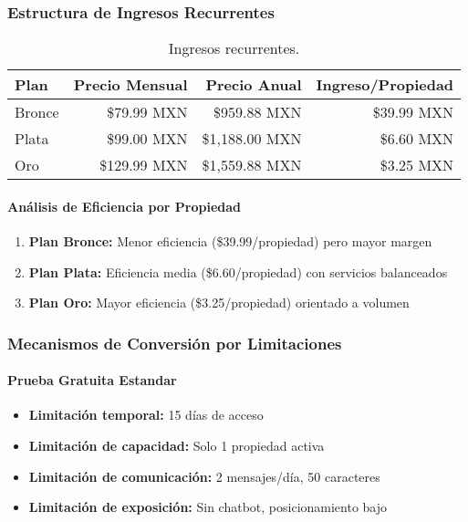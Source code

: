 			\subsubsection{Estructura de Ingresos Recurrentes}
				\begin{table}[h]
					\centering
					\begin{tabular}{|l|r|r|r|}
						\hline
						\textbf{Plan} & \textbf{Precio Mensual} & \textbf{Precio Anual} & \textbf{Ingreso/Propiedad} \\
						\hline
						Bronce & \$79.99 MXN & \$959.88 MXN & \$39.99 MXN \\
						Plata & \$99.00 MXN & \$1,188.00 MXN & \$6.60 MXN \\
						Oro & \$129.99 MXN & \$1,559.88 MXN & \$3.25 MXN \\
						\hline
					\end{tabular}
					\caption{Ingresos recurrentes.}
					\label{tab:ingresos}
				\end{table}
				
				\paragraph{Análisis de Eficiencia por Propiedad}
				\begin{enumerate}
					\item \textbf{Plan Bronce:} Menor eficiencia (\$39.99/propiedad) pero mayor margen
					\item \textbf{Plan Plata:} Eficiencia media (\$6.60/propiedad) con servicios balanceados
					\item \textbf{Plan Oro:} Mayor eficiencia (\$3.25/propiedad) orientado a volumen
				\end{enumerate}
				
				\subsubsection{Mecanismos de Conversión por Limitaciones}
					\paragraph{Prueba Gratuita Estandar}
					\begin{itemize}
						\item \textbf{Limitación temporal:} 15 días de acceso
						\item \textbf{Limitación de capacidad:} Solo 1 propiedad activa
						\item \textbf{Limitación de comunicación:} 2 mensajes/día, 50 caracteres
						\item \textbf{Limitación de exposición:} Sin chatbot, posicionamiento bajo
					\end{itemize}
